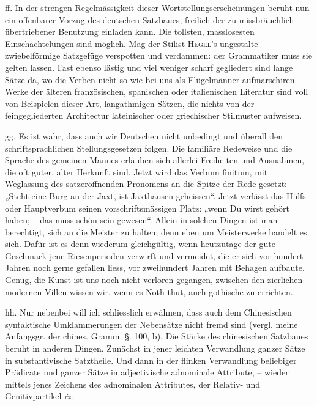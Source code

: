 \largerpage
ff. In der strengen Regelmässigkeit dieser Wortstellungserscheinungen beruht nun ein offenbarer Vorzug des deutschen Satzbaues, freilich  der zu missbräuchlich übertriebener Benutzung einladen kann. Die tollsten, masslosesten Einschachtelungen sind möglich. Mag der Stilist \textsc{Hegel}’s ungestalte zwiebelförmige Satzgefüge verspotten und verdammen: der Grammatiker muss sie gelten lassen. Fast ebenso lästig und viel weniger scharf gegliedert sind lange Sätze da, wo die Verben nicht so wie bei uns als Flügelmänner aufmarschiren. Werke der älteren französischen, spanischen oder italienischen Literatur sind voll von Beispielen dieser Art, langathmigen Sätzen, die nichts von der feingegliederten Architectur lateinischer oder griechischer Stilmuster aufweisen.

gg. Es ist wahr, dass  auch wir Deutschen nicht unbedingt und überall den schriftsprachlichen Stellungsgesetzen folgen. Die familiäre Redeweise und die Sprache des gemeinen Mannes erlauben sich allerlei Freiheiten und Ausnahmen, die oft guter, alter Herkunft sind. Jetzt wird das Verbum finitum, mit Weglassung des satzeröffnenden Pronomens an die Spitze der Rede gesetzt: „Steht eine Burg an der Jaxt, ist Jaxthausen geheissen“. Jetzt verlässt das Hülfs- oder Hauptverbum seinen vorschriftsmässigen Platz: „wenn Du wirst gehört haben; – das muss schön sein gewesen“. Allein in solchen Dingen ist man berechtigt, sich an die Meister zu halten; denn eben um Meisterwerke handelt es sich. Dafür ist es denn wiederum gleichgültig, wenn heutzutage der gute Geschmack jene Riesenperioden verwirft und vermeidet, die er sich vor hundert Jahren noch gerne gefallen liess, vor zweihundert Jahren mit Behagen aufbaute. Genug, die Kunst ist uns noch nicht verloren gegangen, zwischen den zierlichen modernen Villen wissen wir, wenn es Noth thut, auch gothische  zu errichten.

hh. Nur nebenbei will ich schliesslich erwähnen, dass auch dem Chinesischen syntaktische Umklammerungen der Nebensätze nicht fremd sind (vergl. meine Anfangsgr. der chines. Gramm. §. 100, b). Die Stärke des chinesischen Satzbaues beruht in anderen Dingen. Zunächst in jener \label{fp.451} leichten Verwandlung ganzer Sätze in substantivische Satztheile. Und dann in der  flinken Verwandlung beliebiger Prädicate und ganzer Sätze in adjectivische adnominale \label{sp.470} Attribute, – wieder mittels jenes Zeichens des adnominalen Attributes, der Relativ- und Genitivpartikel \textit{čī}.

